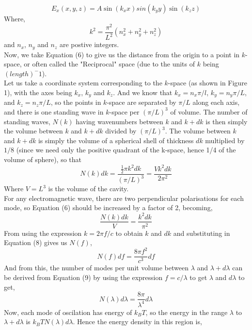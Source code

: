 \begin{equation}
	E_x(x,y,z)=A\sin (k_xx)sin(k_yy)\sin(k_zz)
\end{equation}
Where,
\begin{equation}
	k^2=\frac{\pi ^2}{L^2}(n^2_x+n^2_y+n^2_z)
\end{equation}
and $n_x$, $n_y$ and $n_z$ are postive integers.\\
Now, we take Equation (6) to give us the distance from the origin to a point in $k$-space, or often called the "Reciprocal" space (due to the units of $k$ being $(length)^-1$).\\
Let us take a coordinate system corresponding to the $k$-space (as shown in Figure 1), with the axes being $k_x$, $k_y$ and $k_z$. And we know that $k_x=n_x\pi/l$, $k_y=n_y\pi/L$, and $k_z=n_z\pi/L$, so the points in $k$-space are separated by $\pi/L$ along each axis, and there is one standing wave in $k$-space per $(\pi/L)^3$ of volume. The number of standing waves, $N(k)$ having wavenumbers between $k$ and $k+dk$ is then simply the volume between $k$ and $k+dk$ divided by $(\pi/L)^3$. The volume between $k$ and $k+dk$ is simply the volume of a spherical shell of thickness $dk$ multiplied by $1/8$ (since we need only the positive quadrant of the k-space, hence 1/4 of the volume of sphere), so that
\begin{equation}
	N(k)dk=\frac{\frac{1}{2}\pi k^2dk}{(\pi/L)^3}=\frac{Vk^2dk}{2\pi^2}
\end{equation}
Where $V=L^3$ is the volume of the cavity.\\
For any electromagnetic wave, there are two perpendicular polarisations for each mode, so Equation (6) should be increased by a factor of 2, becoming,
\begin{equation}
	\frac{N(k)dk}{V}=\frac{k^2dk}{\pi^2}
\end{equation}
From using the expression $k=2\pi f/c$ to obtain $k$ and $dk$ and substituting in Equation (8) gives us $N(f)$,
\begin{equation}
	N(f)df=\frac{8\pi f^2}{c^3}df
\end{equation}
And from this, the number of modes per unit volume between $\lambda$ and $\lambda + d\lambda$ can be derived from Equation (9) by using the expression $f=c/\lambda$ to get $\lambda$ and $d\lambda$ to get,
\begin{equation}
	N(\lambda)d\lambda=\frac{8\pi}{\lambda^4}d\lambda
\end{equation}
Now, each mode of oscilation has energy of $k_BT$, so the energy in the range $\lambda$ to $\lambda+d\lambda$ is $k_BTN(\lambda)d\lambda$. Hence the energy density in this region is,
